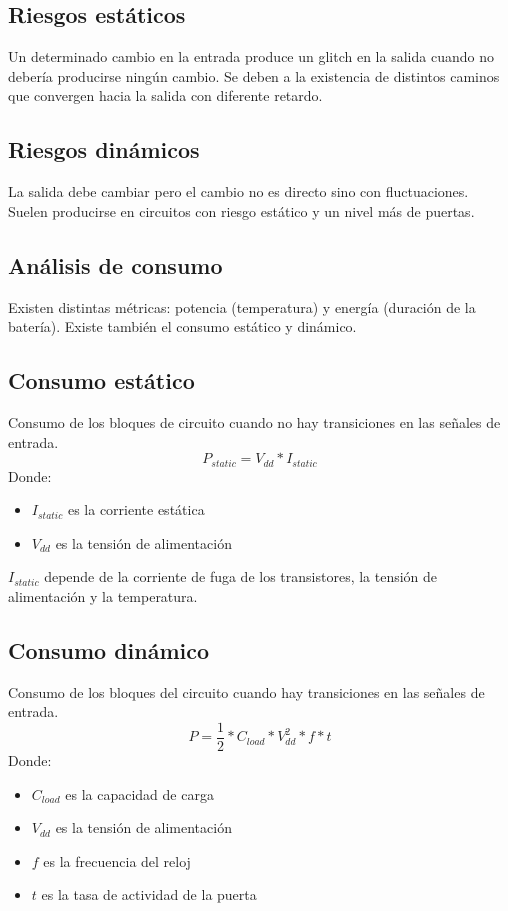 \subsection{Riesgos estáticos}
Un determinado cambio en la entrada produce un glitch en la salida cuando no debería producirse ningún cambio. Se deben a la existencia de distintos caminos que convergen hacia la salida con diferente retardo.

\subsection{Riesgos dinámicos}
La salida debe cambiar pero el cambio no es directo sino con fluctuaciones. Suelen producirse en circuitos con riesgo estático y un nivel más de puertas.

\subsection{Análisis de consumo}
Existen distintas métricas: potencia (temperatura) y  energía (duración de la batería).
Existe también el consumo estático y dinámico.

\subsection{Consumo estático}
Consumo de los bloques de circuito cuando no hay transiciones en las señales de entrada.
\[
	P_{static} = V_{dd} * I_{static}
\]
Donde:
\begin{itemize}
	\item $I_{static}$ es la corriente estática
	\item $V_{dd}$ es la tensión de alimentación
\end{itemize}

$I_{static}$ depende de la corriente de fuga de los transistores, la tensión de alimentación y la temperatura.

\subsection{Consumo dinámico}
Consumo de los bloques del circuito cuando hay transiciones en las señales de entrada.
\[
	P = \frac{1}{2}*C_{load}*V_{dd}^{2} * f * t
\]
Donde:
\begin{itemize}
	\item $C_{load}$ es la capacidad de carga
	\item $V_{dd}$ es la tensión de alimentación
	\item $f$ es la frecuencia del reloj
	\item $t$ es la tasa de actividad de la puerta
\end{itemize}
